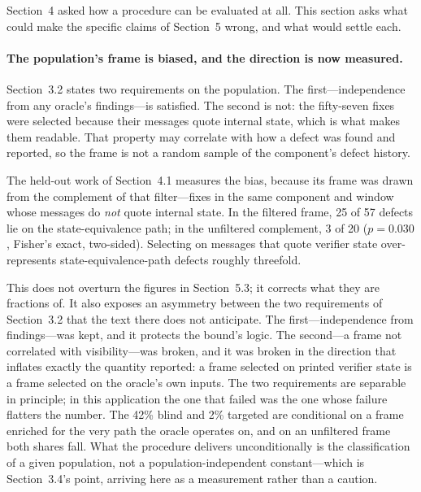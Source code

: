 Section~4 asked how a procedure can be evaluated at all. This section asks what
could make the specific claims of Section~5 wrong, and what would settle each.

\paragraph{The population's frame is biased, and the direction is now measured.}
Section~3.2 states two requirements on the population. The first---independence from
any oracle's findings---is satisfied. The second is not: the fifty-seven fixes were
selected because their messages quote internal state, which is what makes them
readable. That property may correlate with how a defect was found and reported, so
the frame is not a random sample of the component's defect history.

The held-out work of Section~4.1 measures the bias, because its frame was drawn from
the complement of that filter---fixes in the same component and window whose messages
do \emph{not} quote internal state. In the filtered frame, 25 of 57 defects lie on
the state-equivalence path; in the unfiltered complement, 3 of 20
($p = 0.030$, Fisher's exact, two-sided). Selecting on messages that quote verifier
state over-represents state-equivalence-path defects roughly threefold.

This does not overturn the figures in Section~5.3; it corrects what they are
fractions of. It also exposes an asymmetry between the two requirements of
Section~3.2 that the text there does not anticipate. The first---independence from
findings---was kept, and it protects the bound's logic. The second---a frame not
correlated with visibility---was broken, and it was broken in the direction that
inflates exactly the quantity reported: a frame selected on printed verifier state is
a frame selected on the oracle's own inputs. The two requirements are separable in
principle; in this application the one that failed was the one whose failure flatters
the number. The 42\% blind and 2\% targeted are conditional on a frame enriched
for the very path the oracle operates on, and on an unfiltered frame both shares
fall. What the procedure delivers unconditionally is the classification of a given
population, not a population-independent constant---which is Section~3.4's point,
arriving here as a measurement rather than a caution.

